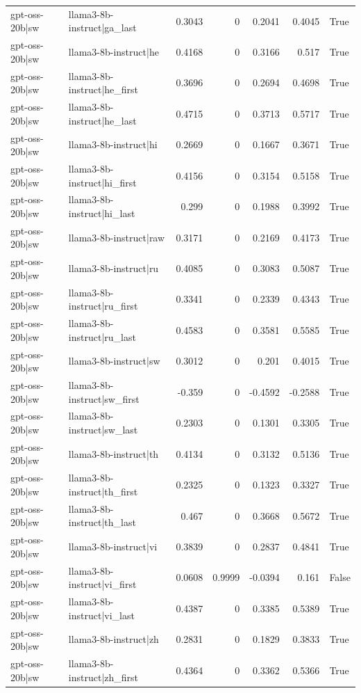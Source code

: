 \begin{table}
\begin{tabular}{l l r r r r l}
gpt-oss-20b|sw & llama3-8b-instruct|ga_last & 0.3043 & 0 & 0.2041 & 0.4045 & True \\
gpt-oss-20b|sw & llama3-8b-instruct|he & 0.4168 & 0 & 0.3166 & 0.517 & True \\
gpt-oss-20b|sw & llama3-8b-instruct|he_first & 0.3696 & 0 & 0.2694 & 0.4698 & True \\
gpt-oss-20b|sw & llama3-8b-instruct|he_last & 0.4715 & 0 & 0.3713 & 0.5717 & True \\
gpt-oss-20b|sw & llama3-8b-instruct|hi & 0.2669 & 0 & 0.1667 & 0.3671 & True \\
gpt-oss-20b|sw & llama3-8b-instruct|hi_first & 0.4156 & 0 & 0.3154 & 0.5158 & True \\
gpt-oss-20b|sw & llama3-8b-instruct|hi_last & 0.299 & 0 & 0.1988 & 0.3992 & True \\
gpt-oss-20b|sw & llama3-8b-instruct|raw & 0.3171 & 0 & 0.2169 & 0.4173 & True \\
gpt-oss-20b|sw & llama3-8b-instruct|ru & 0.4085 & 0 & 0.3083 & 0.5087 & True \\
gpt-oss-20b|sw & llama3-8b-instruct|ru_first & 0.3341 & 0 & 0.2339 & 0.4343 & True \\
gpt-oss-20b|sw & llama3-8b-instruct|ru_last & 0.4583 & 0 & 0.3581 & 0.5585 & True \\
gpt-oss-20b|sw & llama3-8b-instruct|sw & 0.3012 & 0 & 0.201 & 0.4015 & True \\
gpt-oss-20b|sw & llama3-8b-instruct|sw_first & -0.359 & 0 & -0.4592 & -0.2588 & True \\
gpt-oss-20b|sw & llama3-8b-instruct|sw_last & 0.2303 & 0 & 0.1301 & 0.3305 & True \\
gpt-oss-20b|sw & llama3-8b-instruct|th & 0.4134 & 0 & 0.3132 & 0.5136 & True \\
gpt-oss-20b|sw & llama3-8b-instruct|th_first & 0.2325 & 0 & 0.1323 & 0.3327 & True \\
gpt-oss-20b|sw & llama3-8b-instruct|th_last & 0.467 & 0 & 0.3668 & 0.5672 & True \\
gpt-oss-20b|sw & llama3-8b-instruct|vi & 0.3839 & 0 & 0.2837 & 0.4841 & True \\
gpt-oss-20b|sw & llama3-8b-instruct|vi_first & 0.0608 & 0.9999 & -0.0394 & 0.161 & False \\
gpt-oss-20b|sw & llama3-8b-instruct|vi_last & 0.4387 & 0 & 0.3385 & 0.5389 & True \\
gpt-oss-20b|sw & llama3-8b-instruct|zh & 0.2831 & 0 & 0.1829 & 0.3833 & True \\
gpt-oss-20b|sw & llama3-8b-instruct|zh_first & 0.4364 & 0 & 0.3362 & 0.5366 & True \\

\end{tabular}
\end{table}
